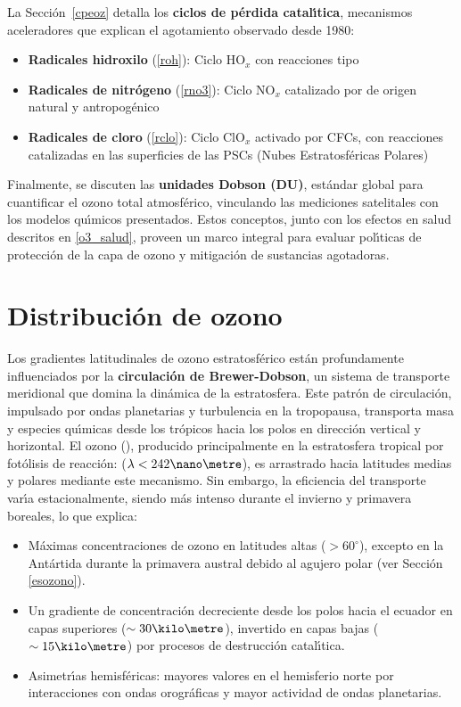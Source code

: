 La Secci\'on~\ref{cpeoz} detalla los \textbf{ciclos de p\'erdida catal\'{\i}tica}, mecanismos aceleradores que explican el agotamiento observado desde 1980:
\begin{itemize}
    \item \textbf{Radicales hidroxilo} (\ref{roh}): Ciclo HO$_x$ con reacciones tipo 
    \item \textbf{Radicales de nitr\'ogeno} (\ref{rno3}): Ciclo NO$_x$ catalizado por  de origen natural y antropog\'enico
    \item \textbf{Radicales de cloro} (\ref{rclo}): Ciclo ClO$_x$ activado por CFCs, con reacciones catalizadas en las superficies de las PSCs (Nubes Estratosf\'ericas Polares)
\end{itemize}

Finalmente, se discuten las \textbf{unidades Dobson (DU)}, est\'andar global para cuantificar el ozono total atmosf\'erico, vinculando las mediciones satelitales con los modelos qu\'{\i}micos presentados. Estos conceptos, junto con los efectos en salud descritos en \ref{o3_salud}, proveen un marco integral para evaluar pol\'{\i}ticas de protecci\'on de la capa de ozono y mitigaci\'on de sustancias agotadoras.

\section{Distribuci\'on de ozono}
\label{dvozono}
Los gradientes latitudinales de ozono estratosf\'erico est\'an profundamente influenciados por la \textbf{circulaci\'on de Brewer-Dobson}, un sistema de transporte meridional que domina la din\'amica de la estratosfera. Este patr\'on de circulaci\'on, impulsado por ondas planetarias y turbulencia en la tropopausa, transporta masa y especies qu\'{\i}micas desde los tr\'opicos hacia los polos en direcci\'on vertical y horizontal. El ozono (), producido principalmente en la estratosfera tropical por fot\'olisis de  reacci\'on:  ($\lambda < 242\nano\metre$), es arrastrado hacia latitudes medias y polares mediante este mecanismo. Sin embargo, la eficiencia del transporte var\'{\i}a estacionalmente, siendo m\'as intenso durante el invierno y primavera boreales, lo que explica:

\begin{itemize}
    \item M\'aximas concentraciones de ozono en latitudes altas ($>60^\circ$), excepto en la Ant\'artida durante la primavera austral debido al agujero polar (ver Secci\'on \ref{esozono}).
    \item Un gradiente de concentraci\'on decreciente desde los polos hacia el ecuador en capas superiores ($\sim30 \kilo\metre$), invertido en capas bajas ($\sim15 \kilo\metre$) por procesos de destrucci\'on catal\'{\i}tica.
    \item Asimetr\'{\i}as hemisf\'ericas: mayores valores en el hemisferio norte por interacciones con ondas orogr\'aficas y mayor actividad de ondas planetarias.
\end{itemize}


